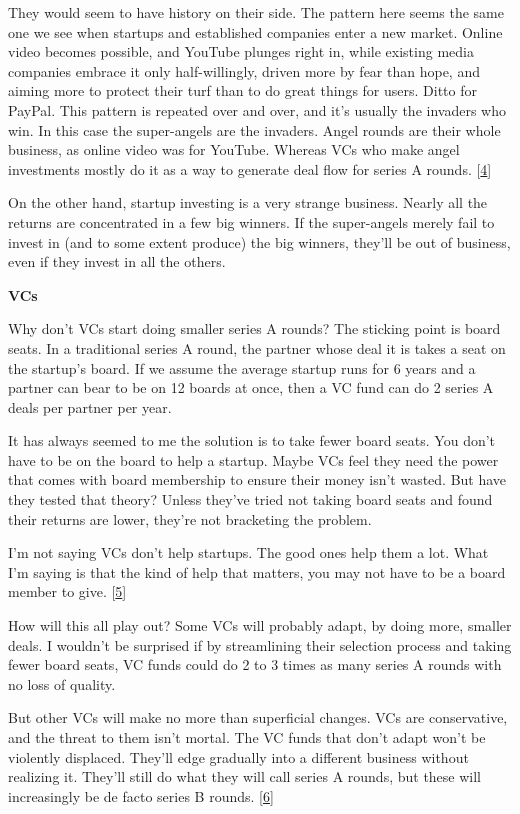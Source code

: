 They would seem to have history on their side.  
The pattern here seems the same
one we see when startups and established companies enter a new
market.  Online video becomes possible, and YouTube plunges right
in, while existing media companies embrace it only half-willingly,
driven more by fear than hope, and aiming more to protect their
turf than to do great things for users.  Ditto for PayPal.  This
pattern is repeated over and over, and it's usually the invaders
who win. In this case the super-angels are the invaders.  Angel
rounds are their whole business, as online video was for YouTube.
Whereas VCs who make angel investments mostly do it as a way to
generate deal flow for series A rounds.
[\href{\#f4n}{4}]

On the other hand, startup investing is a very strange business.
Nearly all the returns are concentrated in a few big winners.  If
the super-angels merely fail to invest in (and to some extent
produce) the big winners, they'll be out of business, even if they
invest in all the others.

\textbf{VCs}

Why don't VCs start doing smaller series A rounds?  The sticking
point is board seats.  In a traditional series A round, the partner
whose deal it is takes a seat on the startup's board.  If we assume
the average startup runs for 6 years and a partner can bear to be
on 12 boards at once, then a VC fund can do 2 series A deals per
partner per year.

It has always seemed to me the solution is to take fewer board
seats.  You don't have to be on the board to help a startup.  Maybe
VCs feel they need the power that comes with board membership to
ensure their money isn't wasted.  But have they tested that theory?
Unless they've tried not taking board seats and found their returns
are lower, they're not bracketing the problem.

I'm not saying VCs don't help startups.  The good ones help them a
lot.  What I'm saying is that the kind of help that matters, you
may not have to be a board member to give.
[\href{\#f5n}{5}]

How will this all play out?  Some VCs will probably adapt, by doing
more, smaller deals.  I wouldn't be surprised if by streamlining
their selection process and taking fewer board seats, VC funds could
do 2 to 3 times as many series A rounds with no loss of quality.

But other VCs will make no more than superficial changes.  VCs are
conservative, and the threat to them isn't mortal.  The VC funds
that don't adapt won't be violently displaced.  They'll edge gradually
into a different business without realizing it.  They'll still do
what they will call series A rounds, but these will increasingly
be de facto series B rounds.
[\href{\#f6n}{6}]

